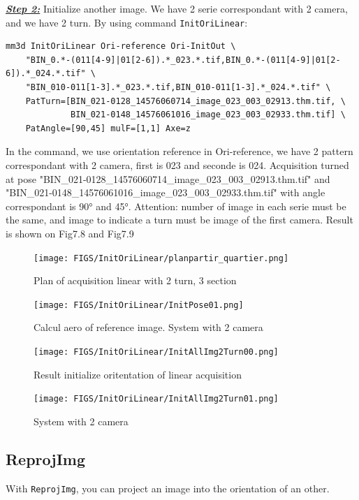 \underline{\textit{\textbf{Step 2:}}} Initialize another image. We have 2 serie correspondant with 2 camera, and we have 2 turn. By using command {\tt InitOriLinear}:
\begin{verbatim}
mm3d InitOriLinear Ori-reference Ori-InitOut \
    "BIN_0.*-(011[4-9]|01[2-6]).*_023.*.tif,BIN_0.*-(011[4-9]|01[2-6]).*_024.*.tif" \
    "BIN_010-011[1-3].*_023.*.tif,BIN_010-011[1-3].*_024.*.tif" \
    PatTurn=[BIN_021-0128_14576060714_image_023_003_02913.thm.tif, \
             BIN_021-0148_14576061016_image_023_003_02933.thm.tif] \
    PatAngle=[90,45] mulF=[1,1] Axe=z
\end{verbatim}

In the command, we use orientation reference in Ori-reference, we have 2 pattern correspondant with 2 camera, first is 023 and seconde is 024. Acquisition turned at pose "BIN\_021-0128\_14576060714\_image\_023\_003\_02913.thm.tif" and "BIN\_021-0148\_14576061016\_image\_023\_003\_02933.thm.tif" with angle correspondant is 90° and 45°. Attention: number of image in each serie must be the same, and image to indicate a turn must be image of the first camera.
Result is shown on Fig7.8 and Fig7.9

\begin{figure}[H]
\centering
\texttt{[image: FIGS/InitOriLinear/planpartir\_quartier.png]}
\caption{Plan of acquisition linear with 2 turn, 3 section}
\label{SurfCorr}
\end{figure}
\begin{figure}[H]
\centering
\texttt{[image: FIGS/InitOriLinear/InitPose01.png]}
\caption{Calcul aero of reference image. System with 2 camera}
\label{SurfCorr}
\end{figure}
\begin{figure}[H]
\centering
\texttt{[image: FIGS/InitOriLinear/InitAllImg2Turn00.png]}
\caption{Result initialize oritentation of linear acquisition}
\label{SurfCorr}
\end{figure}
\begin{figure}[H]
\centering
\texttt{[image: FIGS/InitOriLinear/InitAllImg2Turn01.png]}
\caption{System with 2 camera}
\label{SurfCorr}
\end{figure}

\subsection{ReprojImg}

With {\tt ReprojImg}, you can project an image into the orientation of an other.

